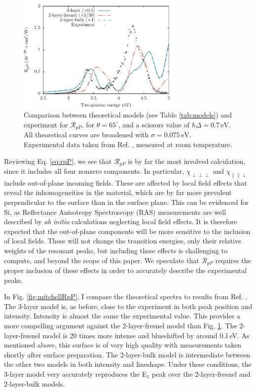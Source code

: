 \begin{figure}
\centering 
\includegraphics[width=0.7\textwidth]{content/figures/fig-4_4_05}
\caption{Comparison between theoretical models (see Table \ref{tab:models}) and
experiment for $\mathcal{R}_{pP}$, for $\theta=65^{\circ}$, and a scissors
value of $\hbar\Delta = 0.7\,\text{eV}$. All theoretical curves are broadened
with $\sigma=0.075\,\text{eV}$. Experimental data taken from Ref.
\cite{mejiaPRB02}, measured at room temperature.}
\label{fig:RpP}
\end{figure}

Reviewing Eq. \eqref{eq:rpP}, we see that $\mathcal{R}_{pP}$ is by far the most involved calculation, since it includes all four nonzero components. In particular, $\chi_{\perp\perp\perp}$ and $\chi_{\parallel\parallel\perp}$ include out-of-plane incoming fields. These are affected by local field effects\cite{tancognedejean:tel-01235611} that reveal the inhomogeneities in the material, which are by far more prevalent perpendicular to the surface than in the surface plane. This can be evidenced for Si, as Reflectance Anisotropy Spectroscopy (RAS) measurements are well described by \emph{ab initio} calculations neglecting local field effects.\cite{palummoPRB99, gaalPRB09} It is therefore expected that the out-of-plane components will be more sensitive to the inclusion of local fields. These will not change the transition energies, only their relative weights of the resonant peaks,\cite{tancognedejean:tel-01235611} but including these effects is challenging to compute,\cite{nicolasPRB15} and beyond the scope of this paper. We speculate that $\mathcal{R}_{pP}$ requires the proper inclusion of these effects in order to accurately describe the experimental peaks.

In Fig. \ref{fig:mitchellRpP}, I compare the theoretical spectra to results from
Ref. \cite{mitchellSS01}. The 3-layer model is, as before, close to the
experiment in both peak position and intensity. Intensity is almost the same the
experimental value. This provides a more compelling argument against the
2-layer-fresnel model than Fig. \ref{fig:RpP}. The 2-layer-fresnel model is 20
times more intense and blueshifted by around 0.1\,eV. As mentioned above, this
surface is of very high quality with measurements taken shortly after surface
preparation. The 2-layer-bulk model is intermediate between the other two models
in both intensity and lineshape. Under these conditions, the 3-layer model very
accurately reproduces the E$_{1}$ peak over the 2-layer-fresnel and 2-layer-bulk
models.

